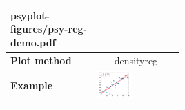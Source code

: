 \begin{refsection}
\begin{subappendices}
\begin{tabular}{l|p{0.25\linewidth}|p{0.25\linewidth}|}
{psyplot-figures/psy-reg-demo.pdf} \\
			\midrule
			\midrule
			\textbf{Plot method} & \multicolumn{2}{c|}{densityreg} \\
			\hline
			\textbf{Example} & 
				\includegraphics[width=\linewidth, page=3]{psyplot-figures/psy-reg-demo.pdf} &

\end{tabular}
\end{subappendices}
\end{refsection}
